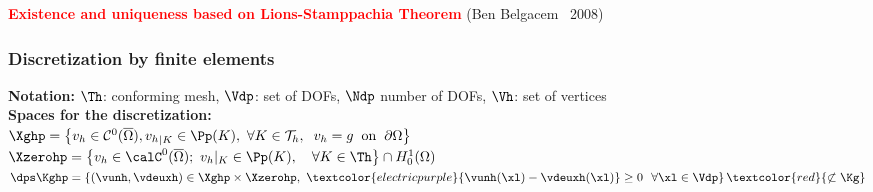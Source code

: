 \documentclass{beamer}
\begin{document}
\begin{frame}
\textcolor{red}{\textbf{Existence and uniqueness based on Lions-Stamppachia Theorem}} (Ben Belgacem \eal \ 2008)
\end{frame}
\begin{frame}
\frametitle{Discretization by finite elements}
\textbf{Notation:} 
$\Th$: conforming mesh, $\Vdp$: set of DOFs, $\Ndp$ number of DOFs, $\Vh$: set of vertices\\
\vspace{0.2 cm}
\textcolor{cadmiumgreen}{\textbf{Spaces for the discretization:}}\\
$\Xghp=\left\{v_h \in \mathcal{C}^0(\overline{\Omega}),  {v_h}_{|K} \in \Pp (K), \ \forall K \in {\mathcal{T}}_h, \hspace{0.2 cm} v_h=g \hspace{0.2 cm} \mbox{on} \hspace{0.2 cm} \partial \Omega\right\}$\\
\vspace*{0.3 cm}
$\Xzerohp =\left\{v_h \in \calC^0(\overline{\Omega}); \ {v_h}|_{K} \in \Pp (K), \quad \forall K \in \Th \right\} \cap H_0^1(\Omega)$
\\
\vspace*{0.3 cm}
$\dps \Kghp=\left\{(\vunh,\vdeuxh) \in \Xghp \times \Xzerohp, \ \textcolor{electricpurple}{\vunh(\xl)-\vdeuxh(\xl)} \geq 0 \ \ \forall \xl \in \Vdp \right\} \textcolor{red}{\not \subset \Kg}$\\

\end{frame}
\end{document}
